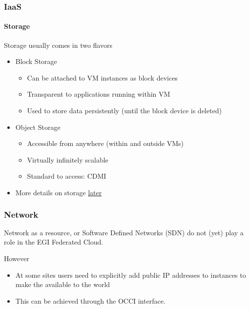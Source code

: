 \begin{frame}
\frametitle{IaaS}
\framesubtitle{Storage}
Storage usually comes in two flavors
\begin{itemize}
\item Block Storage
  \begin{itemize}
  \item Can be attached to VM instances as block devices
  \item Transparent to applications running within VM
  \item Used to store data persistently (until the block device is deleted)
  \end{itemize}
\item Object Storage
  \begin{itemize}
  \item Accessible from anywhere (within and outside VMs)
  \item Virtually infinitely scalable
  \item Standard to access: CDMI
  \end{itemize}
\item More details on storage \hyperlink{part_storage}{later}
\end{itemize}
\end{frame}

\begin{frame}
\frametitle{Network}
Network as a resource, or Software Defined Networks (SDN) do not (yet) play a role in the EGI Federated Cloud.

\vspace{1em}
However
\begin{itemize}
\item At some sites users need to explicitly add public IP addresses
  to instances to make the available to the world
\item This can be achieved through the OCCI interface.
\end{itemize}
\end{frame}

